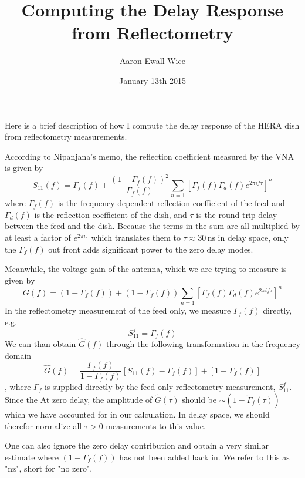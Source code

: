 \documentclass{article}
\begin{document}
\title{Computing the Delay Response from Reflectometry}
\author{Aaron Ewall-Wice}
\date{January 13th 2015}
\maketitle
Here is a brief description of how I compute the delay response of the HERA dish from reflectometry measurements. 

According to Nipanjana's memo, the reflection coefficient measured by the VNA is given by 
\begin{equation}
S_{11}(f)=\Gamma_f(f) + \frac{(1-\Gamma_f(f))^2}{\Gamma_f(f)} \sum_{n=1} \left[ \Gamma_f(f) \Gamma_d(f) e^{2 \pi i f \tau} \right]^n
\end{equation}
where $\Gamma_f(f)$ is the frequency dependent reflection coefficient of the feed and $\Gamma_d(f)$ is the reflection coefficient of the dish, and $\tau$ is the round trip delay between the feed and the dish. Because the terms in the sum are all multiplied by at least a factor of $e^{2 \pi i \tau}$ which translates them to $\tau \approx 30$\,ns in delay space, only the $\Gamma_f(f)$ out front adds significant power to the zero delay modes. 

Meanwhile, the voltage gain of the antenna, which we are trying to measure is given by 
\begin{equation}
G(f) = (1-\Gamma_f(f)) + (1-\Gamma_f(f)) \sum_{n=1} \left[\Gamma_f(f) \Gamma_d(f) e^{2 \pi i f \tau} \right]^n
\end{equation}
In the reflectometry measurement of the feed only, we measure $\Gamma_f(f)$ directly, e.g.
\begin{equation}
S_{11}^f = \Gamma_f(f)
\end{equation}
We can than obtain $\widehat{G}(f)$ through the following transformation in the frequency domain
\begin{equation}\label{eq:estimate:YesZ}
\widehat{G}(f) = \frac{\Gamma_f(f)}{1-\Gamma_f(f)} \left[S_{11}(f) - \Gamma_f(f) \right] + \left[1-\Gamma_f(f) \right]
\end{equation},
where $\Gamma_f$ is supplied directly by the feed only reflectometry measurement, $S_{11}^f$. 
Since the 
At zero delay, the amplitude of $\widetilde{G}(\tau)$ should be $\sim (1-\widetilde{\Gamma}_f(\tau))$ which we have accounted for in our calculation. In delay space, we should therefor normalize all $\tau>0$ measurements to this value. 

One can also ignore the zero delay contribution and obtain a very similar estimate where $(1-\Gamma_f(f))$ has not been added back in. We refer to this as "nz", short for "no zero". 
\end{document}

